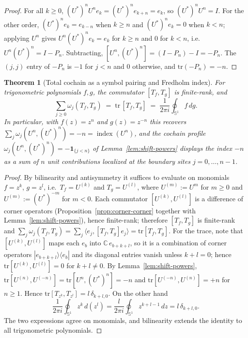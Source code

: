 \documentclass[10pt]{amsart}
\newcommand{\1}{{\mathbb{I}}}
\newcommand{\ind}{\operatorname{index}}
\newtheorem{theorem}{Theorem}[section]
\numberwithin{equation}{section}
\begin{document}
\begin{proof}
For all $k\ge0$, $(U^*)^n U^n e_k=(U^*)^n e_{k+n}=e_k$, so $(U^*)^n U^n=I$. For the other order,
$(U^*)^n e_k=e_{k-n}$ when $k\ge n$ and $(U^*)^n e_k=0$ when $k<n$; applying $U^n$ gives
$U^n(U^*)^n e_k=e_k$ for $k\ge n$ and $0$ for $k<n$, i.e.\ $U^n(U^*)^n=I-P_n$. Subtracting,
$[U^n,(U^*)^n]=(I-P_n)-I=-P_n$. The $(j,j)$ entry of $-P_n$ is $-1$ for $j<n$ and $0$ otherwise,
and $\mathrm{tr}(-P_n)=-n$.
\end{proof}

\begin{theorem}[Total cochain as a symbol pairing and Fredholm index]\label{thm:index}
For trigonometric polynomials $f,g$, the commutator $[T_f,T_g]$ is finite-rank, and
\[
\sum_{j\ge0}\omega_j(T_f,T_g)\;=\;\mathrm{tr}\,[T_f,T_g]\;=\;\frac{1}{2\pi i}\oint_{\mathbb{S}^1} f\,dg .
\]
In particular, with $f(z)=z^n$ and $g(z)=z^{-n}$ this recovers
$\sum_j\omega_j(U^n,(U^*)^n)=-n=\ind(U^n)$, and the cochain profile
$\omega_j(U^n,(U^*)^n)=-\mathbf{1}_{\{j<n\}}$ of Lemma~\ref{lem:shift-powers} displays the index
$-n$ as a sum of $n$ unit contributions localized at the boundary sites $j=0,\dots,n-1$.
\end{theorem}

\begin{proof}
By bilinearity and antisymmetry it suffices to evaluate on monomials $f=z^k$, $g=z^l$, i.e.\
$T_f=U^{(k)}$ and $T_g=U^{(l)}$, where $U^{(m)}:=U^m$ for $m\ge0$ and $U^{(m)}:=(U^*)^{-m}$ for
$m<0$. Each commutator $[U^{(k)},U^{(l)}]$ is a difference of corner operators
(Proposition~\ref{prop:corner-corner} together with Lemma~\ref{lem:shift-powers}), hence
finite-rank; therefore $[T_f,T_g]$ is finite-rank and
$\sum_j\omega_j(T_f,T_g)=\sum_j\langle e_j,[T_f,T_g]e_j\rangle=\mathrm{tr}[T_f,T_g]$. For the trace,
note that $[U^{(k)},U^{(l)}]$ maps each $e_b$ into $\mathbb{C}\,e_{b+k+l}$, so it is a combination of
corner operators $|e_{b+k+l}\rangle\langle e_b|$ and its diagonal entries vanish unless $k+l=0$;
hence $\mathrm{tr}[U^{(k)},U^{(l)}]=0$ for $k+l\ne0$. By
Lemma~\ref{lem:shift-powers}, $\mathrm{tr}[U^{(n)},U^{(-n)}]=\mathrm{tr}[U^n,(U^*)^n]=-n$ and
$\mathrm{tr}[U^{(-n)},U^{(n)}]=+n$ for $n\ge1$. Hence $\mathrm{tr}[T_{z^k},T_{z^l}]=l\,\delta_{k+l,0}$.
On the other hand
\[
\frac{1}{2\pi i}\oint_{\mathbb{S}^1} z^k\,d(z^l)
=\frac{l}{2\pi i}\oint_{\mathbb{S}^1} z^{k+l-1}\,dz
=l\,\delta_{k+l,0}.
\]
The two expressions agree on monomials, and bilinearity extends the identity to all
trigonometric polynomials.
\end{proof}
\end{document}
